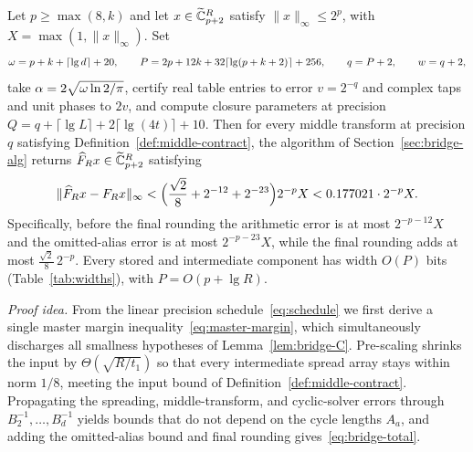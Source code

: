 \begin{theorem}\label{thm:bridge-precision}
Let $p\ge\max(8,k)$ and let $x\in\widetilde{\mathbb{C}}_{p+2}^R$ satisfy $\|x\|_\infty\le 2^p$, with $X=\max(1,\|x\|_\infty)$. Set
\begin{equation}\label{eq:schedule}
  \omega=p+k+\lceil\lg d\rceil+20,\qquad
  P=2p+12k+32\lceil\lg(p+k+2)\rceil+256,\qquad
  q=P+2,\qquad
  w=q+2,
\end{equation}
take $\alpha=2\sqrt{\omega\ln 2/\pi}$, certify real table entries to error $v=2^{-q}$ and complex taps and unit phases to
$2v$, and compute closure parameters at precision $Q=q+\lceil\lg L\rceil+2\lceil\lg(4t)\rceil+10$. Then for every middle
transform at precision $q$ satisfying Definition~\ref{def:middle-contract}, the algorithm of
Section~\ref{sec:bridge-alg} returns $\widehat F_R x\in\widetilde{\mathbb{C}}_{p+2}^R$ satisfying
\begin{equation}\label{eq:bridge-total}
  \|\widehat F_R x-F_R x\|_\infty<\Bigl(\frac{\sqrt2}{8}+2^{-12}+2^{-23}\Bigr)2^{-p}X<0.177021\cdot 2^{-p}X.
\end{equation}
Specifically, before the final rounding the arithmetic error is at most $2^{-p-12}X$ and the omitted-alias error is at
most $2^{-p-23}X$, while the final rounding adds at most $\frac{\sqrt2}{8}\,2^{-p}$. Every stored and intermediate
component has width $O(P)$ bits (Table~\ref{tab:widths}), with $P=O(p+\lg R)$.
\end{theorem}

\emph{Proof idea.} From the linear precision schedule~\eqref{eq:schedule} we first derive a single master margin
inequality~\eqref{eq:master-margin}, which simultaneously discharges all smallness hypotheses of Lemma~\ref{lem:bridge-C}.
Pre-scaling shrinks the input by $\Theta(\sqrt{R/t_1})$ so that every intermediate spread array stays within norm $1/8$,
meeting the input bound of Definition~\ref{def:middle-contract}. Propagating the spreading, middle-transform, and
cyclic-solver errors through $B_2^{-1},\dots,B_d^{-1}$ yields bounds that do not depend on the cycle lengths $A_a$, and
adding the omitted-alias bound and final rounding gives~\eqref{eq:bridge-total}.

